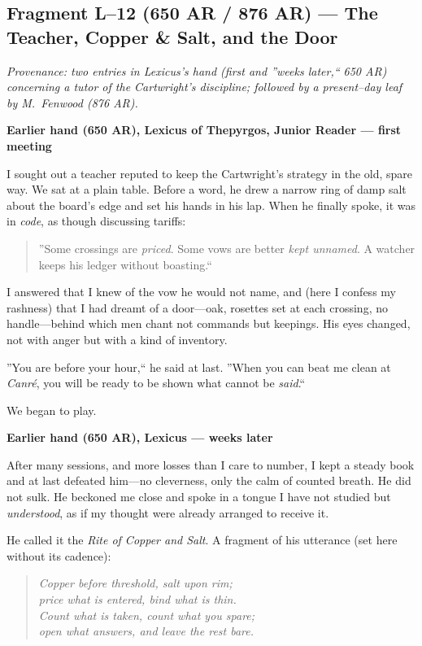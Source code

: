 \documentclass[11pt]{article}
\numberwithin{equation}{section} %
\theoremstyle{plain} %
\theoremstyle{definition} %
\theoremstyle{remark} %
\begin{document}
\subsection{Fragment L--12 (650 AR / 876 AR) --- The Teacher, Copper \& Salt, and the Door}
\label{frag:l12}

\noindent\textit{Provenance: two entries in Lexicus's hand (first and ''weeks later,`` 650 AR) concerning a tutor of the Cartwright's discipline; followed by a present--day leaf by M.\ Fenwood (876 AR).}

\medskip
\noindent\textbf{Earlier hand (650 AR), Lexicus of Thepyrgos, Junior Reader --- first meeting}

I sought out a teacher reputed to keep the Cartwright's strategy in the old, spare way. We sat at a plain table. Before a word, he drew a narrow ring of damp salt about the board's edge and set his hands in his lap. When he finally spoke, it was in \emph{code}, as though discussing tariffs:

\begin{quote}\small
''Some crossings are \emph{priced}. Some vows are better \emph{kept unnamed}. A watcher keeps his ledger without boasting.``
\end{quote}

I answered that I knew of the vow he would not name, and (here I confess my rashness) that I had dreamt of a door---oak, rosettes set at each crossing, no handle---behind which men chant not commands but keepings. His eyes changed, not with anger but with a kind of inventory.

''You are before your hour,`` he said at last. ''When you can beat me clean at \textit{Canr\'e}, you will be ready to be shown what cannot be \emph{said}.``

We began to play.

\medskip
\noindent\textbf{Earlier hand (650 AR), Lexicus --- weeks later}

After many sessions, and more losses than I care to number, I kept a steady book and at last defeated him---no cleverness, only the calm of counted breath. He did not sulk. He beckoned me close and spoke in a tongue I have not studied but \emph{understood}, as if my thought were already arranged to receive it.

He called it the \textit{Rite of Copper and Salt}. A fragment of his utterance (set here without its cadence):

\begin{quote}\small
\textit{Copper before threshold, salt upon rim;\\
price what is entered, bind what is thin.\\
Count what is taken, count what you spare;\\
open what answers, and leave the rest bare.}
\end{quote}
\end{document}
